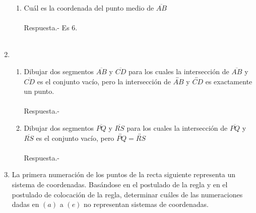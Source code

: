 \begin{enumerate}
\begin{enumerate}[\bfseries (a)]
\item Cuál es la coordenada del punto medio de $\overline{AB}$\\\\
Respuesta.- \; Es 6.\\\\
\end{enumerate}

\item  \begin{enumerate}[\bfseries (a)]
\item Dibujar dos segmentos $\overline{AB}$ y $\overline{CD}$ para los cuales la intersección de $\overline{AB}$ y $\overline{CD}$ es el conjunto vacío, pero la intersección de $\overleftrightarrow{AB}$ y $\overleftrightarrow{CD}$ es exactamente un punto.\\\\
Respuesta.- \; 
\begin{center}
\end{center}

\item Dibujar dos segmentos $\overline{PQ}$ y $\overline{RS}$ para los cuales la intersección de $\overline{PQ}$ y $\overline{RS}$ es el conjunto vacío, pero $\overleftrightarrow{PQ} = \overleftrightarrow{RS}$\\\\
Respuesta.- \;  
\end{enumerate}

\item La primera numeración de los puntos de la recta siguiente representa un sistema de coordenadas. Basándose en el postulado de la regla y en el postulado de colocación de la regla, determinar cuáles de las numeraciones dadas en $(a)$ a $(e)$ no representan sistemas de coordenadas.
\begin{center}
\end{center}


\end{enumerate}
